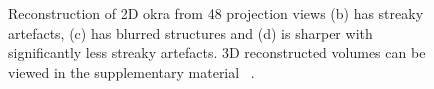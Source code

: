 \documentclass[journal]{IEEEtran}
\begin{document}
\begin{figure}[!h]
{}
\caption{Reconstruction of 2D okra from 48 projection views
   (b) has streaky artefacts, (c) has blurred structures and (d) is sharper with significantly less streaky artefacts. 3D reconstructed volumes can be viewed  in the supplementary material ~\cite{supp_paper}.}
\label{fig:okra_2D_results}
\end{figure}
\end{document}
